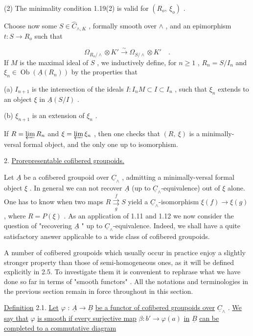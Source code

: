(2)  The minimality condition 1.19(2)  is valid for  $(R_o,\ \xi_o)$  .

Choose now some  $S \in \hat{C}_{\wedge,K}$ , formally smooth over  $\wedge$ , and an epimorphism $t : S \longrightarrow R_o$  such that

\begin{equation*}
\Omega_{R_o/\wedge} \otimes K' \overset{\sim}{\longrightarrow} \Omega_{S/\wedge} \otimes K' \quad .
\end{equation*}
If  $M$  is the maximal ideal of  $S$ , we inductively define, for  $n \geq 1$ , $R_n = S/I_n$  and  $\xi_n \in \operatorname{Ob}(\underline{A}(R_n))$  by the properties that

(a)  $I_{n+1}$  is the intersection of the ideals  $I : I_n M \subset I \subset I_n$ , such that  $\xi_n$ extends to an object  $\xi$  in  $\underline{A}(S/I)$  .

(b)  $\xi_{n+1}$  is an extension of  $\xi_n$  .

If  $R = \varprojlim R_n$  and  $\xi = \varprojlim \xi_n$ , then one checks that  $(R,\ \xi)$  is a minimally-versal formal object, and the only one up to isomorphism.


2. \underline{Prorepresentable cofibered groupoids.}

Let  $\underline{A}$  be a cofibered groupoid over  $\underline{C}_\wedge$ , admitting a minimally-versal formal object  $\xi$ . In general we can not recover  $\underline{A}$  (up to  $\underline{C}_\wedge$-equivalence) out of  $\xi$  alone. One has to know when two maps  $R \overset{f}{\underset{g}{\rightrightarrows}} S$  yield a  $\underline{C}_\wedge$-isomorphism $\xi(f) \longrightarrow \xi(g)$ , where  $R = P(\xi)$ . As an application of 1.11  and 1.12 we now consider the question of  "recovering  $\underline{A}$ "  up to  $\underline{C}_\wedge$-equivalence. Indeed, we
shall have a quite satisfactory answer applicable to a wide class of cofibered groupoids.

A number of cofibered groupoids which usually occur in practice enjoy a slightly stronger property than those of semi-homogeneous ones, as it will be defined explicitly in 2.5. To investigate them it is convenient to rephrase what we have done so far in terms of  "smooth functors" . All the notations and terminologies in the previous section remain in force throughout in this section.

\underline{Definition} 2.1.  \underline{Let}  $\varphi$ : $\underline{A} \longrightarrow \underline{B}$  \underline{be a functor of cofibered groupoids over}  $\underline{C}_\wedge$ . \underline{We say that}  $\varphi$  \underline{is smooth if every surjective map}  $\beta : b' \longrightarrow \varphi(a)$  \underline{in}  $\underline{B}$  \underline{can be completed to a commutative diagram}

